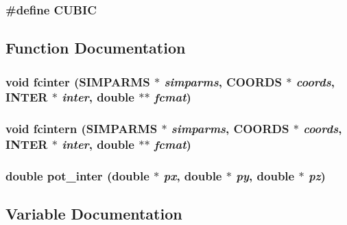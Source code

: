 \subsubsection{\setlength{\rightskip}{0pt plus 5cm}\#define CUBIC}\label{md__fintermat_8c_7c4d2b81af3d1fd0723a5c3e53146d52}




\subsection{Function Documentation}
\subsubsection{\setlength{\rightskip}{0pt plus 5cm}void fcinter ({\bf SIMPARMS} $\ast$ {\em simparms}, {\bf COORDS} $\ast$ {\em coords}, {\bf INTER} $\ast$ {\em inter}, double $\ast$$\ast$ {\em fcmat})}\label{md__fintermat_8c_c63caeef38827ce84f45d8477a1cd6ba}


\subsubsection{\setlength{\rightskip}{0pt plus 5cm}void fcintern ({\bf SIMPARMS} $\ast$ {\em simparms}, {\bf COORDS} $\ast$ {\em coords}, {\bf INTER} $\ast$ {\em inter}, double $\ast$$\ast$ {\em fcmat})}\label{md__fintermat_8c_6405b085112acc8f9f87b74c1f5db01e}


\subsubsection{\setlength{\rightskip}{0pt plus 5cm}double pot\_\-inter (double $\ast$ {\em px}, double $\ast$ {\em py}, double $\ast$ {\em pz})}\label{md__fintermat_8c_0a3de8557bac0930b067108ab9f2f7f0}




\subsection{Variable Documentation}
